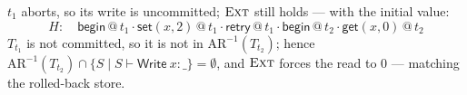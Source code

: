 \documentclass[manuscript,nonacm]{acmart}
\makeatletter
\theoremstyle{acmdefinition}
\newcommand{\bbegin}{\textsf{begin}}
\newcommand{\retry}{\textsf{retry}}
\newcommand{\getev}[3]{\textsf{get}(#1,#2)\,@\,#3}
\newcommand{\setev}[3]{\textsf{set}(#1,#2)\,@\,#3}
\makeatother
\begin{document}
\begin{example}
$t_1$ aborts, so its write is uncommitted; $\textsc{Ext}$ still holds --- with the
initial value:
\[
H:\quad \bbegin\,@\,t_1 \cdot \setev{x}{2}{t_1} \cdot \retry\,@\,t_1
      \cdot \bbegin\,@\,t_2 \cdot \getev{x}{0}{t_2}
\]
$T_{t_1}$ is not committed, so it is not in $\mathrm{AR}^{-1}(T_{t_2})$; hence
$\mathrm{AR}^{-1}(T_{t_2}) \cap \{S \mid S \vdash \mathsf{Write}\ x:\_\} = \emptyset$,
and $\textsc{Ext}$ forces the read to $0$ --- matching the rolled-back store.
\end{example}
\end{document}
